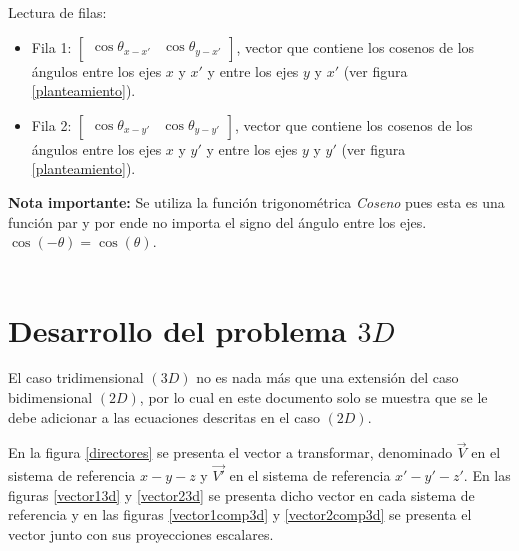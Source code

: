 \documentclass[12pt,letterpaper]{article}
\begin{document}
%
Lectura de filas:
%
\begin{itemize}
	\item Fila 1: $ \left[ \begin{array}{cc}
		\cos \theta_{x-x'} &	 \cos \theta_{y-x'}
	\end{array} \right]$, vector que contiene los cosenos de los ángulos entre los ejes $x$ y $x'$ y entre los ejes $y$ y $x'$ (ver figura \ref{planteamiento}).
	\item Fila 2: $ \left[ \begin{array}{cc}
		\cos \theta_{x-y'} &	 \cos \theta_{y-y'}
	\end{array} \right]$, vector que contiene los cosenos de los ángulos entre los ejes $x$ y $y'$ y entre los ejes $y$ y $y'$ (ver figura \ref{planteamiento}).
\end{itemize}
%
{\bf Nota importante: } Se utiliza la función trigonométrica {\it{Coseno}} pues esta es una función par y por ende no importa el signo del ángulo entre los ejes.\\
$\cos \left( -\theta \right) = \cos \left( \theta \right)$.\\\\


\section{Desarrollo del problema $3D$}
%
El caso tridimensional $(3D)$ no es nada más que una extensión del caso bidimensional $(2D)$, por lo cual en este documento solo se muestra que se le debe adicionar a las ecuaciones descritas en el caso $(2D)$. 

En la figura \ref{directores} se presenta el vector a transformar, denominado $\overset{\rightarrow}{V}$ en el sistema de referencia $x-y-z$ y $\overset{\rightarrow}{V'}$ en el sistema de referencia $x'-y'-z'$. En las figuras \ref{vector13d} y \ref{vector23d} se presenta dicho vector en cada sistema de referencia y en las figuras \ref{vector1comp3d} y \ref{vector2comp3d} se presenta el vector junto con sus proyecciones escalares.\\\\
\end{document}
